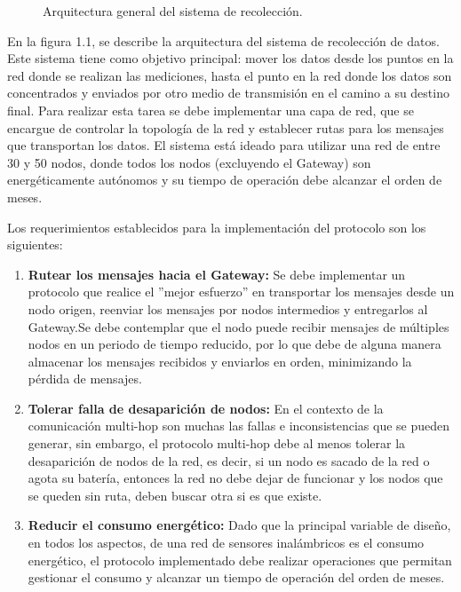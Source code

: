 \begin{figure}[H]
\caption{Arquitectura general del sistema de recolección.}
\end{figure}

En la figura 1.1, se describe la arquitectura del sistema de recolección de datos. Este sistema tiene como objetivo principal: mover los datos desde los puntos en la red donde se realizan las mediciones, hasta el punto en la red donde los datos son concentrados y enviados por otro medio de transmisión en el camino a su destino final. Para realizar esta tarea se debe implementar una capa de red, que se encargue de controlar la topología de la red y establecer rutas para los mensajes que transportan los datos. El sistema está ideado para utilizar una red de entre 30 y 50 nodos, donde todos los nodos (excluyendo el Gateway) son energéticamente autónomos y su tiempo de operación debe alcanzar el orden de meses.

Los requerimientos establecidos para la implementación del protocolo son los siguientes:

\begin{enumerate}
\item \textbf{Rutear los mensajes hacia el Gateway:} Se debe implementar un protocolo que realice el ''mejor esfuerzo'' en transportar los mensajes desde un nodo origen, reenviar los mensajes por nodos intermedios y entregarlos al Gateway.Se debe contemplar que el nodo puede recibir mensajes de múltiples nodos en un periodo de tiempo reducido, por lo que debe de alguna manera almacenar los mensajes recibidos y enviarlos en orden, minimizando la pérdida de mensajes.\\

\item \textbf{Tolerar falla de desaparición de nodos:} En el contexto de la comunicación multi-hop son muchas las fallas e inconsistencias que se pueden generar, sin embargo, el protocolo multi-hop debe al menos tolerar la desaparición de nodos de la red, es decir, si un nodo es sacado de la red o agota su batería, entonces la red no debe dejar de funcionar y los nodos que se queden sin ruta, deben buscar otra si es que existe.\\

\item\textbf{Reducir el consumo energético:} Dado que la principal variable de diseño, en todos los aspectos, de una red de sensores inalámbricos es el consumo energético, el protocolo implementado debe realizar operaciones que permitan gestionar el consumo y alcanzar un tiempo de operación del orden de meses. \\
\end{enumerate}


